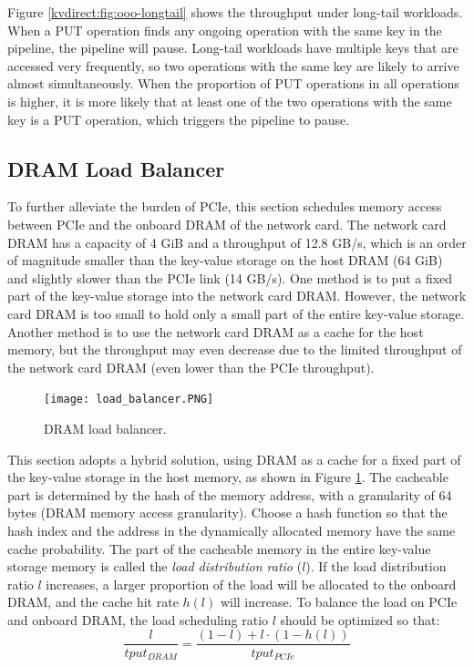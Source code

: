 Figure \ref {kvdirect:fig:ooo-longtail} shows the throughput under long-tail workloads. When a PUT operation finds any ongoing operation with the same key in the pipeline, the pipeline will pause. Long-tail workloads have multiple keys that are accessed very frequently, so two operations with the same key are likely to arrive almost simultaneously. When the proportion of PUT operations in all operations is higher, it is more likely that at least one of the two operations with the same key is a PUT operation, which triggers the pipeline to pause.

\subsection{DRAM Load Balancer}
\label{kvdirect:sec:dram-cache}

To further alleviate the burden of PCIe, this section schedules memory access between PCIe and the onboard DRAM of the network card. The network card DRAM has a capacity of 4 GiB and a throughput of 12.8 GB/s, which is an order of magnitude smaller than the key-value storage on the host DRAM (64 GiB) and slightly slower than the PCIe link (14 GB/s). One method is to put a fixed part of the key-value storage into the network card DRAM. However, the network card DRAM is too small to hold only a small part of the entire key-value storage. Another method is to use the network card DRAM as a cache for the host memory, but the throughput may even decrease due to the limited throughput of the network card DRAM (even lower than the PCIe throughput).

\begin{figure}[htbp]
	\centering
	\texttt{[image: load\_balancer.PNG]}
	\caption{DRAM load balancer.}
	\label{kvdirect:fig:cache}
\end{figure}

This section adopts a hybrid solution, using DRAM as a cache for a fixed part of the key-value storage in the host memory, as shown in Figure \ref {kvdirect:fig:cache}. The cacheable part is determined by the hash of the memory address, with a granularity of 64 bytes (DRAM memory access granularity). Choose a hash function so that the hash index and the address in the dynamically allocated memory have the same cache probability. The part of the cacheable memory in the entire key-value storage memory is called the \textit {load distribution ratio} ($ l $). If the load distribution ratio $ l $ increases, a larger proportion of the load will be allocated to the onboard DRAM, and the cache hit rate $h(l)$ will increase. To balance the load on PCIe and onboard DRAM, the load scheduling ratio $ l $ should be optimized so that:
$$\frac{l}{tput_{DRAM}} = \frac{(1-l) + l \cdot (1-h(l))}{tput_{PCIe}}$$

